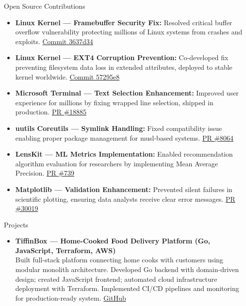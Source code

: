 \documentclass{resume} %
\begin{document}
\begin{rSection}{Open Source Contributions}
\begin{itemize}[left=0pt,itemsep=0pt]
  \item \textbf{Linux Kernel — Framebuffer Security Fix:} Resolved critical buffer overflow vulnerability protecting millions of Linux systems from crashes and exploits. \href{https://git.kernel.org/pub/scm/linux/kernel/git/torvalds/linux.git/commit/?id=3637d34b35b287ab830e66048841ace404382b67}{Commit 3637d34}
  \item \textbf{Linux Kernel — EXT4 Corruption Prevention:} Co-developed fix preventing filesystem data loss in extended attributes, deployed to stable kernel worldwide. \href{https://git.kernel.org/pub/scm/linux/kernel/git/torvalds/linux.git/commit/?id=57295e835408d8d425bef58da5253465db3d6888}{Commit 57295e8}
  \item \textbf{Microsoft Terminal — Text Selection Enhancement:} Improved user experience for millions by fixing wrapped line selection, shipped in production. \href{https://github.com/microsoft/terminal/pull/18885}{PR \#18885}
  \item \textbf{uutils Coreutils — Symlink Handling:} Fixed compatibility issue enabling proper package management for musl-based systems. \href{https://github.com/uutils/coreutils/pull/8064}{PR \#8064}
  \item \textbf{LensKit — ML Metrics Implementation:} Enabled recommendation algorithm evaluation for researchers by implementing Mean Average Precision. \href{https://github.com/lenskit/lkpy/pull/739}{PR \#739}
  \item \textbf{Matplotlib — Validation Enhancement:} Prevented silent failures in scientific plotting, ensuring data analysts receive clear error messages. \href{https://github.com/matplotlib/matplotlib/pull/30019}{PR \#30019}
\end{itemize}
\end{rSection}

\begin{rSection}{Projects}
\begin{itemize}[left=0pt,itemsep=2pt]
  \item \textbf{TiffinBox — Home-Cooked Food Delivery Platform (Go, JavaScript, Terraform, AWS)}\\
        Built full-stack platform connecting home cooks with customers using modular monolith architecture. Developed Go backend with domain-driven design; created JavaScript frontend; automated cloud infrastructure deployment with Terraform. Implemented CI/CD pipelines and monitoring for production-ready system. \href{https://github.com/orgs/Appster-Capstone-Project/repositories}{GitHub}
\end{itemize}
\end{rSection}
\end{document}
